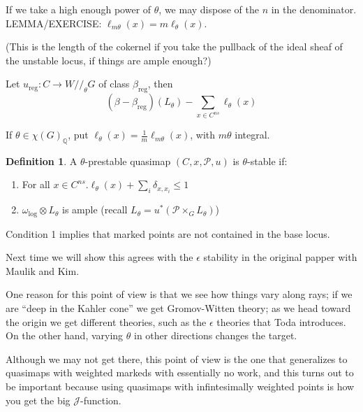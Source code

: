 \documentclass{amsart}
\theoremstyle{definition}
\newtheorem{definition}[dummy]{Definition}
\newcommand{\GIT}{//}
\newcommand{\J}{\mathcal{J}}
\newcommand{\Q}{\mathbb{Q}}
\begin{document}
If we take a high enough power of $\theta$, we may dispose of the $n$ in the denominator.
LEMMA/EXERCISE: $\ell_{m\theta}(x)=m\ell_{\theta}(x)$.

(This is the length of the cokernel if you take the pullback of the ideal sheaf of the unstable locus, if things are ample enough?)


Let $u_{\text{reg}}:C\to W\GIT_\theta G$ of class $\beta_{\text{reg}}$, then 
$$(\beta-\beta_{\text{reg}})(L_\theta)-\sum_{x\in C^{ns}}\ell_\theta(x)$$

If $\theta\in\chi(G)_\Q$, put $\ell_\theta(x)=\frac{1}{m}\ell_{m\theta}(x)$, with $m\theta$ integral.


\begin{definition}
A $\theta$-prestable quasimap $(C,x,\mathcal{P},u)$ is $\theta$-stable if:
\begin{enumerate}
\item For all $x\in C^{ns}. \ell_\theta(x)+\sum_i \delta_{x,x_i}\leq 1$
\item $\omega_{\text{log}}\otimes L_\theta$ is ample (recall $L_\theta=u^*(\mathcal{P}\times_G L_\theta)$)
\end{enumerate}

Condition 1 implies that marked points are not contained in the base locus.
\end{definition}

Next time we will show this agrees with the $\epsilon$ stability in the original papper with Maulik and Kim.

One reason for this point of view is that we see how things vary along rays; if we are ``deep in the Kahler cone'' we get Gromov-Witten theory; as we head toward the origin we get different theories, such as the $\epsilon$ theories that Toda introduces.  On the other hand, varying $\theta$ in other directions changes the target.

Although we may not get there, this point of view is the one that generalizes to quasimaps with weighted markeds with essentially no work, and this turns out to be important because using quasimaps with infintesimally weighted points is how you get the big $\J$-function.
\end{document}
